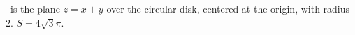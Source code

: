 {\surfaceS\ is the plane $z=x+y$ over the circular disk, centered at the origin, with radius 2.
}
{$S = 4\sqrt{3}\pi$.
}
